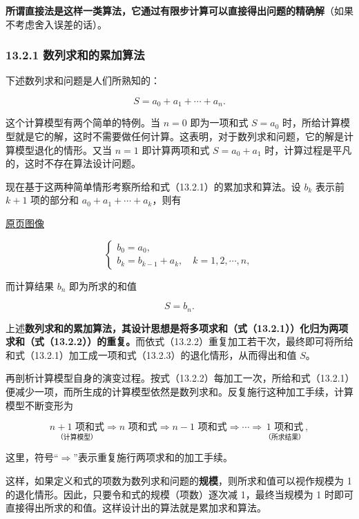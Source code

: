 \documentclass[
  10pt,
  fontset=fandol]{ctexart}
\begin{document}
\textbf{所谓直接法是这样一类算法，它通过有限步计算可以直接得出问题的精确解}（如果不考虑舍入误差的话）。

\subsubsection{13.2.1 数列求和的累加算法}\label{ux6570ux5217ux6c42ux548cux7684ux7d2fux52a0ux7b97ux6cd5}

下述数列求和问题是人们所熟知的：

\[
S=a_0+a_1+\cdots+a_n.
\tag{13.2.1}
\]

这个计算模型有两个简单的特例。当 \(n=0\) 即为一项和式 \(S=a_0\) 时，所给计算模型就是它的解，这时不需要做任何计算。这表明，对于数列求和问题，它的解是计算模型退化的情形。又当 \(n=1\) 即计算两项和式 \(S=a_0+a_1\) 时，计算过程是平凡的，这时不存在算法设计问题。

现在基于这两种简单情形考察所给和式（13.2.1）的累加求和算法。设 \(b_k\) 表示前 \(k+1\) 项的部分和 \(a_0+a_1+\cdots+a_k\)，则有

\href{../../source-images/pdf-309.jpeg}{原页图像}

\[
\begin{cases}
b_0=a_0,\\
b_k=b_{k-1}+a_k,\quad k=1,2,\cdots,n,
\end{cases}
\tag{13.2.2}
\]

而计算结果 \(b_n\) 即为所求的和值

\[
S=b_n.
\tag{13.2.3}
\]

上述\textbf{数列求和的累加算法，其设计思想是将多项求和（式（13.2.1））化归为两项求和（式（13.2.2））的重复。}而依式（13.2.2）重复加工若干次，最终即可将所给和式（13.2.1）加工成一项和式（13.2.3）的退化情形，从而得出和值 \(S\)。

再剖析计算模型自身的演变过程。按式（13.2.2）每加工一次，所给和式（13.2.1）便减少一项，而所生成的计算模型依然是数列求和。反复施行这种加工手续，计算模型不断变形为

\[
\underset{\text{（计算模型）}}{n+1\text{ 项和式}}
\Rightarrow n\text{ 项和式}
\Rightarrow n-1\text{ 项和式}
\Rightarrow\cdots\Rightarrow
\underset{\text{（所求结果）}}{1\text{ 项和式}},
\]

这里，符号``\(\Rightarrow\)''表示重复施行两项求和的加工手续。

这样，如果定义和式的项数为数列求和问题的\textbf{规模}，则所求和值可以视作规模为 1 的退化情形。因此，只要令和式的规模（项数）逐次减 1，最终当规模为 1 时即可直接得出所求的和值。这样设计出的算法就是累加求和算法。
\end{document}
